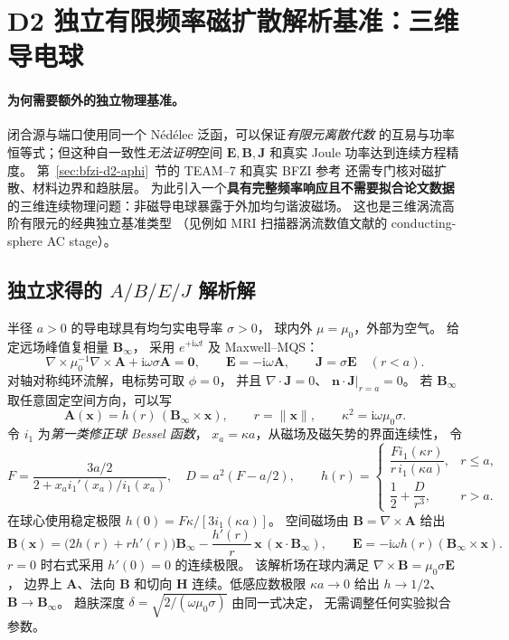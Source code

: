 \section{D2 独立有限频率磁扩散解析基准：三维导电球}
\label{sec:bfzi-d2-ac-sphere}

\paragraph{为何需要额外的独立物理基准。}
闭合源与端口使用同一个 N\'ed\'elec 泛函，可以保证\emph{有限元离散代数}
的互易与功率恒等式；但这种自一致性\emph{无法证明}空间
$\bm E,\bm B,\bm J$ 和真实 Joule 功率达到连续方程精度。
第~\ref{sec:bfzi-d2-aphi}~节的 TEAM--7 和真实 BFZI 参考
还需专门核对磁扩散、材料边界和趋肤层。
为此引入一个\textbf{具有完整频率响应且不需要拟合论文数据}
的三维连续物理问题：非磁导电球暴露于外加均匀谐波磁场。
这也是三维涡流高阶有限元的经典独立基准类型
（见例如 MRI 扫描器涡流数值文献的 conducting-sphere AC stage）。

\subsection{独立求得的 $A/B/E/J$ 解析解}
半径 $a>0$ 的导电球具有均匀实电导率 $\sigma>0$，
球内外 $\mu=\mu_0$，外部为空气。
给定远场峰值复相量 $\bm B_\infty$，
采用 $e^{+\mathrm i\omega t}$ 及 Maxwell--MQS：
\begin{equation}
\nabla\times\mu_0^{-1}\nabla\times\bm A
 +\mathrm i\omega\sigma\bm A=\bm0,\qquad
\bm E=-\mathrm i\omega\bm A,\qquad
\bm J=\sigma\bm E
\quad (r<a).
\end{equation}
对轴对称纯环流解，电标势可取 $\phi=0$，
并且 $\nabla\cdot\bm J=0$、
$\bm n\cdot\bm J|_{r=a}=0$。
若 $\bm B_\infty$ 取任意固定空间方向，可以写
\begin{equation}
\bm A(\bm x)=h(r)\,(\bm B_\infty\times\bm x),\qquad
r=\|\bm x\|,\qquad
\kappa^2=\mathrm i\omega\mu_0\sigma.
\end{equation}
令 $i_1$ 为\emph{第一类修正球 Bessel 函数}，
$x_a=\kappa a$，从磁场及磁矢势的界面连续性，
令
\begin{equation}
F=\frac{3a/2}{2+x_a i_1'(x_a)/i_1(x_a)},\quad
D=a^2(F-a/2),\qquad
h(r)=\begin{cases}
\dfrac{F i_1(\kappa r)}{r\,i_1(\kappa a)},&r\leq a,\\[6pt]
\dfrac12+\dfrac{D}{r^3},&r>a.
\end{cases}
\end{equation}
在球心使用稳定极限
$h(0)=F\kappa/[3i_1(\kappa a)]$。
空间磁场由 $\bm B=\nabla\times\bm A$ 给出
\begin{equation}
\boxed{
\bm B(\bm x)=
\bigl(2h(r)+rh'(r)\bigr)\bm B_\infty
-\frac{h'(r)}{r}\,\bm x\,(\bm x\cdot\bm B_\infty),
\qquad
\bm E=-\mathrm i\omega h(r)(\bm B_\infty\times\bm x).}
\end{equation}
$r=0$ 时右式采用 $h'(0)=0$ 的连续极限。
该解析场在球内满足
$\nabla\times\bm B=\mu_0\sigma\bm E$，
边界上 $\bm A$、法向 $\bm B$ 和切向 $\bm H$
连续。低感应数极限 $\kappa a\to0$ 给出
$h\to1/2$、$\bm B\to\bm B_\infty$。
趋肤深度
$\delta=\sqrt{2/(\omega\mu_0\sigma)}$ 由同一式决定，
无需调整任何实验拟合参数。

